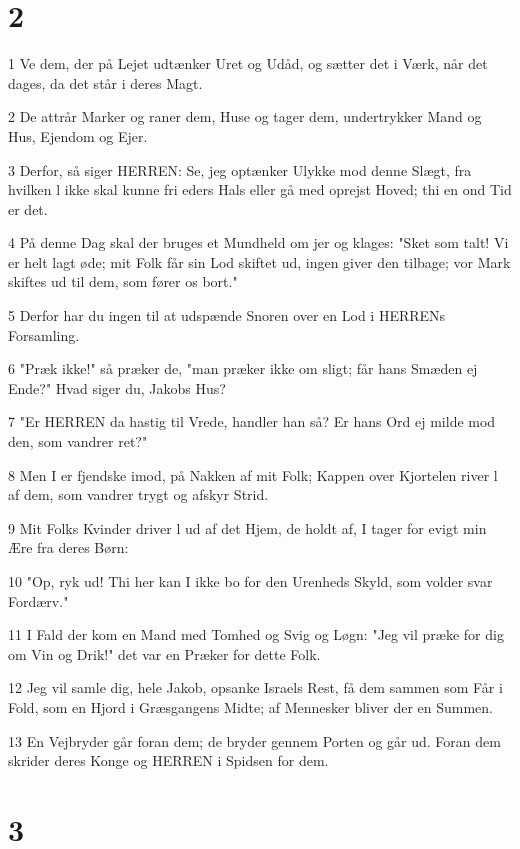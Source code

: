 \chapter{2}

\par 1 Ve dem, der på Lejet udtænker Uret og Udåd, og sætter det i Værk, når det dages, da det står i deres Magt.
\par 2 De attrår Marker og raner dem, Huse og tager dem, undertrykker Mand og Hus, Ejendom og Ejer.
\par 3 Derfor, så siger HERREN: Se, jeg optænker Ulykke mod denne Slægt, fra hvilken l ikke skal kunne fri eders Hals eller gå med oprejst Hoved; thi en ond Tid er det.
\par 4 På denne Dag skal der bruges et Mundheld om jer og klages: "Sket som talt! Vi er helt lagt øde; mit Folk får sin Lod skiftet ud, ingen giver den tilbage; vor Mark skiftes ud til dem, som fører os bort."
\par 5 Derfor har du ingen til at udspænde Snoren over en Lod i HERRENs Forsamling.
\par 6 "Præk ikke!" så præker de, "man præker ikke om sligt; får hans Smæden ej Ende?" Hvad siger du, Jakobs Hus?
\par 7 "Er HERREN da hastig til Vrede, handler han så? Er hans Ord ej milde mod den, som vandrer ret?"
\par 8 Men I er fjendske imod, på Nakken af mit Folk; Kappen over Kjortelen river l af dem, som vandrer trygt og afskyr Strid.
\par 9 Mit Folks Kvinder driver l ud af det Hjem, de holdt af, I tager for evigt min Ære fra deres Børn:
\par 10 "Op, ryk ud! Thi her kan I ikke bo for den Urenheds Skyld, som volder svar Fordærv."
\par 11 I Fald der kom en Mand med Tomhed og Svig og Løgn: "Jeg vil præke for dig om Vin og Drik!" det var en Præker for dette Folk.
\par 12 Jeg vil samle dig, hele Jakob, opsanke Israels Rest, få dem sammen som Får i Fold, som en Hjord i Græsgangens Midte; af Mennesker bliver der en Summen.
\par 13 En Vejbryder går foran dem; de bryder gennem Porten og går ud. Foran dem skrider deres Konge og HERREN i Spidsen for dem.

\chapter{3}

